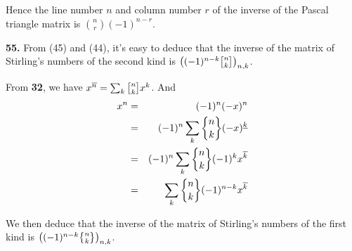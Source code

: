 \documentclass[a4paper,12pt]{article}
\newcommand{\newpar}[1]{\bigskip \noindent \textbf{#1.}}
\newcommand{\stirlingone}[2]{{#1 \atopwithdelims[]#2}}
\newcommand{\stirlingtwo}[2]{{#1 \atopwithdelims\{\}#2}}
\begin{document}
Hence the line number $n$ and column number $r$ of the inverse of the
Pascal triangle matrix is ${n \choose r} (-1)^{n-r}$.

\newpar{55} From (45) and (44), it's easy to deduce that the inverse
of the matrix of Stirling's numbers of the second kind is
$\left((-1)^{n-k}\stirlingone{n}{k}\right)_{n, k}$.

From \textbf{32}, we have $x^{\overline{n}} = \sum_k
\stirlingone{n}{k} x^k$. And
\begin{eqnarray*}
  x^n &=& (-1)^n (-x)^n \\
  &=& (-1)^n \sum_k \stirlingtwo{n}{k} (-x)^{\underline{k}} \\
  &=& (-1)^n \sum_k \stirlingtwo{n}{k} (-1)^k x^{\overline{k}} \\
  &=& \sum_k \stirlingtwo{n}{k}(-1)^{n-k} x^{\overline{k}}
\end{eqnarray*}

We then deduce that the inverse of the matrix of Stirling's numbers of
the first kind is $\left((-1)^{n-k}\stirlingtwo{n}{k}\right)_{n,k}$.
\end{document}
